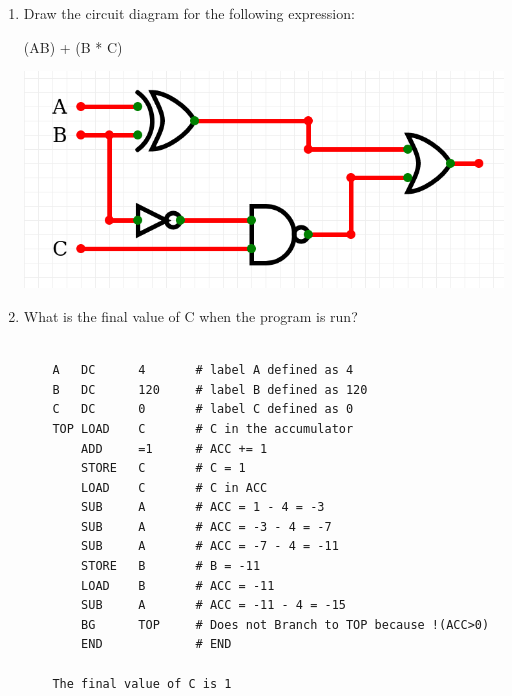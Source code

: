 \documentclass[12pt,a4paper,english]{article}
\begin{document}
\begin{enumerate}
\item Draw the circuit diagram for the following expression:

  (A\oplus B) + \lnot(\lnot B * C)

  \includegraphics[scale=.5]{logicdrawing}

\item What is the final value of C when the program is run?
  \begin{lstlisting}

    A   DC      4       # label A defined as 4
    B   DC      120     # label B defined as 120
    C   DC      0       # label C defined as 0
    TOP LOAD    C       # C in the accumulator
        ADD     =1      # ACC += 1
        STORE   C       # C = 1
        LOAD    C       # C in ACC
        SUB     A       # ACC = 1 - 4 = -3
        SUB     A       # ACC = -3 - 4 = -7
        SUB     A       # ACC = -7 - 4 = -11
        STORE   B       # B = -11
        LOAD    B       # ACC = -11
        SUB     A       # ACC = -11 - 4 = -15
        BG      TOP     # Does not Branch to TOP because !(ACC>0)
        END             # END 

    The final value of C is 1

\end{lstlisting}

\end{enumerate}
\end{document}
